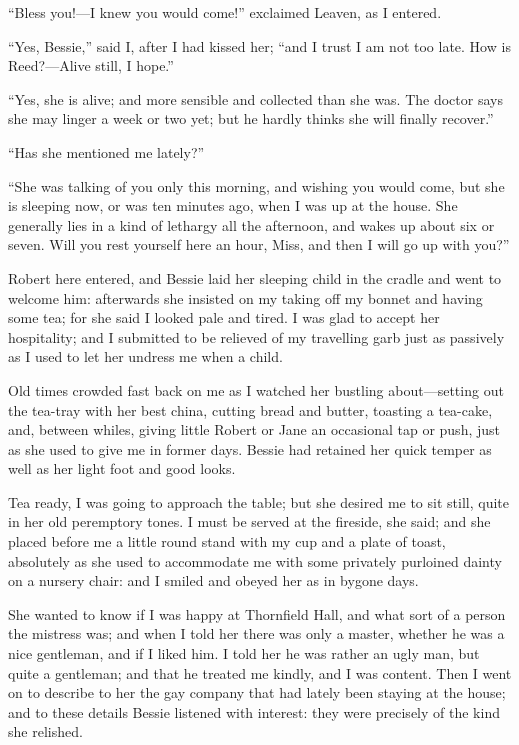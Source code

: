 \enquote{Bless you!---I knew you would come!} exclaimed \Mrs{} Leaven, as
I entered.

\enquote{Yes, Bessie,} said I, after I had kissed her; \enquote{and I
trust I am not too late. How is \Mrs{} Reed?---Alive still, I hope.}

\enquote{Yes, she is alive; and more sensible and collected than she
was. The doctor says she may linger a week or two yet; but he hardly
thinks she will finally recover.}

\enquote{Has she mentioned me lately?}

\enquote{She was talking of you only this morning, and wishing you would
come, but she is sleeping now, or was ten minutes ago, when I was up at
the house. She generally lies in a kind of lethargy all the afternoon,
and wakes up about six or seven. Will you rest yourself here an hour,
Miss, and then I will go up with you?}

Robert here entered, and Bessie laid her sleeping child in the cradle
and went to welcome him: afterwards she insisted on my taking off my
bonnet and having some tea; for she said I looked pale and tired. I was
glad to accept her hospitality; and I submitted to be relieved of my
travelling garb just as passively as I used to let her undress me when a
child.

Old times crowded fast back on me as I watched her bustling
about---setting out the tea-tray with her best china, cutting bread and
butter, toasting a tea-cake, and, between whiles, giving little Robert
or Jane an occasional tap or push, just as she used to give me in former
days. Bessie had retained her quick temper as well as her light foot
and good looks.

Tea ready, I was going to approach the table; but she desired me to sit
still, quite in her old peremptory tones. I must be served at the
fireside, she said; and she placed before me a little round stand with
my cup and a plate of toast, absolutely as she used to accommodate me
with some privately purloined dainty on a nursery chair: and I smiled
and obeyed her as in bygone days.

She wanted to know if I was happy at Thornfield Hall, and what sort of a
person the mistress was; and when I told her there was only a master,
whether he was a nice gentleman, and if I liked him. I told her he was
rather an ugly man, but quite a gentleman; and that he treated me
kindly, and I was content. Then I went on to describe to her the gay
company that had lately been staying at the house; and to these details
Bessie listened with interest: they were precisely of the kind she
relished.

